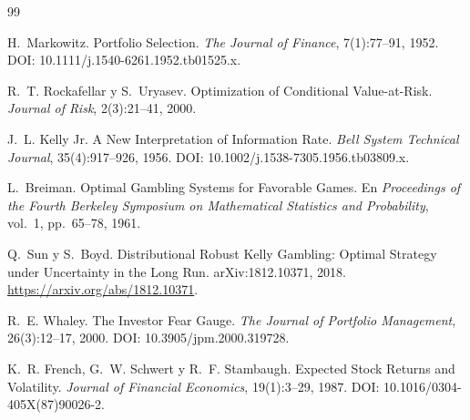 \documentclass[11pt]{article}
\begin{document}






\begin{thebibliography}{99}


H.~Markowitz.
\newblock Portfolio Selection.
\newblock \emph{The Journal of Finance}, 7(1):77--91, 1952.
\newblock DOI: 10.1111/j.1540-6261.1952.tb01525.x.

R.~T. Rockafellar y S.~Uryasev.
\newblock Optimization of Conditional Value-at-Risk.
\newblock \emph{Journal of Risk}, 2(3):21--41, 2000.

J.~L. Kelly Jr.
\newblock A New Interpretation of Information Rate.
\newblock \emph{Bell System Technical Journal}, 35(4):917--926, 1956.
\newblock DOI: 10.1002/j.1538-7305.1956.tb03809.x.

L.~Breiman.
\newblock Optimal Gambling Systems for Favorable Games.
\newblock En \emph{Proceedings of the Fourth Berkeley Symposium on
  Mathematical Statistics and Probability}, vol.~1, pp.~65--78, 1961.

Q.~Sun y S.~Boyd.
\newblock Distributional Robust Kelly Gambling: Optimal Strategy under
  Uncertainty in the Long Run.
\newblock arXiv:1812.10371, 2018.
\newblock \url{https://arxiv.org/abs/1812.10371}.

R.~E. Whaley.
\newblock The Investor Fear Gauge.
\newblock \emph{The Journal of Portfolio Management}, 26(3):12--17, 2000.
\newblock DOI: 10.3905/jpm.2000.319728.

K.~R. French, G.~W. Schwert y R.~F. Stambaugh.
\newblock Expected Stock Returns and Volatility.
\newblock \emph{Journal of Financial Economics}, 19(1):3--29, 1987.
\newblock DOI: 10.1016/0304-405X(87)90026-2.


\end{thebibliography}
\end{document}
